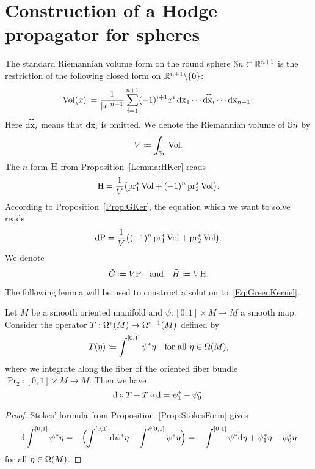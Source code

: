 \documentclass[\MainFolder/Text.tex]{subfiles}
\begin{document}
\section{Construction of a Hodge propagator for spheres}
\label{Sec:GreenSphere}

The standard Riemannian volume form on the round sphere $\mathbb{S}{n}\subset \mathbb{R}^{n+1}$ is the restriction of the following closed form on $\mathbb{R}^{n+1}\backslash \{0\}$:  
$$ \mathrm{Vol}(x) \coloneqq \frac{1}{|x|^{n+1}}\sum_{i=1}^{n+1} (-1)^{i+1} x^i \operatorname{dx}_1 \dotsm \widehat{\operatorname{dx}_i} \dotsm \operatorname{dx}_{n+1}. $$
Here $\widehat{\operatorname{dx}_i}$ means that $\operatorname{dx_i}$ is omitted. We denote the Riemannian volume of $\mathbb{S}{n}$ by
$$ V\coloneqq \int_{\mathbb{S}{n}} \mathrm{Vol}. $$
The $n$-form $\mathrm{H}$ from Proposition~\ref{Lemma:HKer} reads
\begin{equation*}
\mathrm{H} =  \frac{1}{V}\bigl(\operatorname{\mathrm{pr}}_1^*\mathrm{Vol} +  (-1)^{n} \operatorname{\mathrm{pr}}_2^*\mathrm{Vol}\bigr).
\end{equation*}
According to Proposition~\ref{Prop:GKer}, the equation which we want to solve reads
\begin{equation} \label{Eq:GreenKernel}
\mathrm{d} \mathrm{P} = \frac{1}{V}\bigl((-1)^{n}\operatorname{\mathrm{pr}}_1^*\mathrm{Vol} +  \operatorname{\mathrm{pr}}_2^*\mathrm{Vol}\bigr).
\end{equation}
We denote 
$$\tilde{G}\coloneqq V\mathrm{P}\quad\text{and}\quad \tilde{H}\coloneqq V\mathrm{H}.$$

The following lemma will be used to construct a solution to~\eqref{Eq:GreenKernel}. 
\begin{Lem}\label{Lem:ChainHtpy}
Let $M$ be a smooth oriented manifold and $\psi: [0,1]\times M \rightarrow M$ a smooth map. Consider the operator $T: \Omega^*(M) \rightarrow \Omega^{*-1}(M)$ defined by
$$ T(\eta) \coloneqq \int^{[0,1]} \psi^*\eta\quad\text{for all }\eta\in \Omega(M), $$
where we integrate along the fiber of the oriented fiber bundle $\Pr_2: [0,1]\times M \rightarrow M$. Then we have
$$ \mathrm{d}\circ T + T\circ \mathrm{d} = \psi_1^* - \psi_0^*. $$
\end{Lem}
%
\begin{proof}
Stokes' formula from Proposition~\ref{Prop:StokesForm} gives
$$ \mathrm{d} \int^{[0,1]}\psi^*\eta = -\Bigl( \int^{[0,1]} \mathrm{d} \psi^* \eta - \int^{\partial [0,1]} \psi^* \eta \Bigr) = - \int^{[0,1]} \psi^* \mathrm{d} \eta + \psi^*_1 \eta - \psi^*_0 \eta$$
for all $\eta \in \Omega(M)$.
\end{proof}
\end{document}
